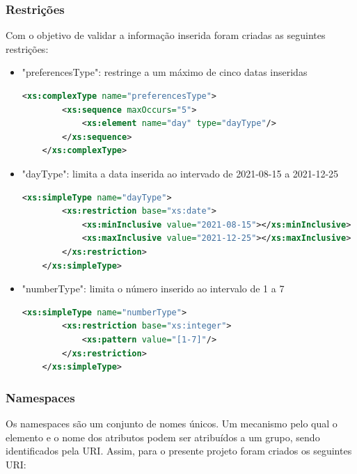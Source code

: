 \documentclass{article}
\begin{document}
\subsubsection{Restrições}
\hspace{0.5cm} Com o objetivo de validar a informação inserida foram criadas as seguintes restrições:
\begin{itemize}
    \item "preferencesType": restringe a um máximo de cinco datas inseridas
\begin{lstlisting}[language=XML, caption=Restrição preferencesType]
    <xs:complexType name="preferencesType">
        <xs:sequence maxOccurs="5">
            <xs:element name="day" type="dayType"/>
        </xs:sequence>
    </xs:complexType>
\end{lstlisting}

    \item "dayType": limita a data inserida ao intervado de 2021-08-15 a 2021-12-25
\begin{lstlisting}[language=XML, caption=Restrição dayType]
    <xs:simpleType name="dayType">
        <xs:restriction base="xs:date">
            <xs:minInclusive value="2021-08-15"></xs:minInclusive> 
            <xs:maxInclusive value="2021-12-25"></xs:maxInclusive> 
        </xs:restriction>
    </xs:simpleType>
\end{lstlisting}

    \item "numberType": limita o número inserido ao intervalo de 1 a 7
\begin{lstlisting}[language=XML, caption=Restrição numberType]
    <xs:simpleType name="numberType">
        <xs:restriction base="xs:integer"> 
            <xs:pattern value="[1-7]"/>
        </xs:restriction>
    </xs:simpleType>
\end{lstlisting}
\end{itemize}




\subsubsection{Namespaces}
\hspace{0.5cm} Os namespaces são um conjunto de nomes únicos. Um mecanismo pelo qual o elemento e o nome dos atributos podem ser atribuídos a um grupo, sendo identificados pela URI. Assim, para o presente projeto foram criados os seguintes URI:
\end{document}
